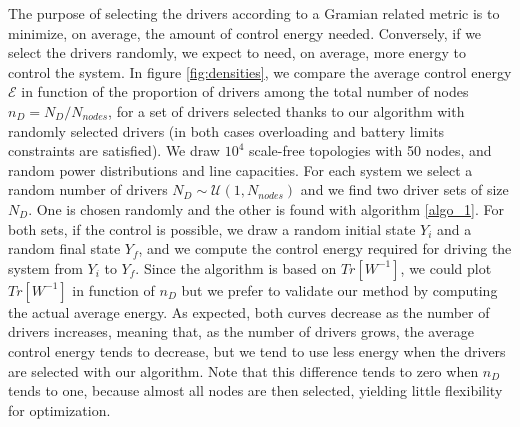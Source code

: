\documentclass[conference]{IEEEtran}
\begin{document}



The purpose of selecting the drivers according to a Gramian related metric is to minimize, on average, the amount of control energy needed. Conversely, if we select the drivers randomly, we expect to need, on average, more energy to control the system. In figure \ref{fig:densities}, we compare the average control energy  $\mathcal{E}$ in function of the proportion of drivers among the total number of nodes $n_D = N_D/N_{nodes}$, for a set of drivers selected thanks to our algorithm with randomly selected drivers (in both cases overloading and battery limits constraints are satisfied). We draw $10^4$ scale-free topologies with 50 nodes, and random power distributions and line capacities.  For each system we select a random number of drivers $N_D \sim \mathcal{U}(1,N_{nodes}) $ and we find two driver sets of size $N_D $. One is chosen randomly and the other is found with algorithm \ref{algo_1}. For both sets, if the control is possible, we draw a random initial state $Y_i$ and a random final state $Y_f$, and we compute the control energy required for driving the system from $Y_i$ to $Y_f$. Since the algorithm is based on $ Tr[W^{-1}]$, we could plot $ Tr[W^{-1}]$ in function of $n_D$ but we prefer to validate our method by computing the actual average energy. As expected, both curves decrease as the number of drivers increases, meaning that, as the number of drivers grows, the average control energy tends to decrease, but we tend to use less energy when the drivers are selected with our algorithm. Note that this difference tends to zero when $n_D$ tends to one, because almost all nodes are then selected, yielding little flexibility for optimization.
\end{document}
